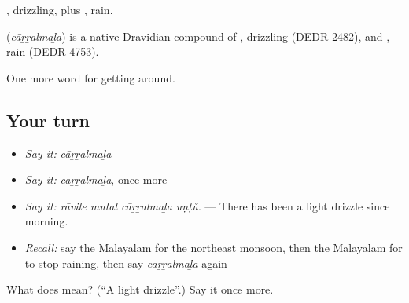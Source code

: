 , drizzling, plus , rain.

\begin{cousinweb}
\textbf{} (\emph{cāṟṟalmaḻa}) is a native Dravidian compound of , drizzling (DEDR 2482), and , rain (DEDR 4753).
\end{cousinweb}

\begin{grammarlens}[title={What you've built}]
One more word for getting around.
\end{grammarlens}

\subsection*{Your turn}
\begin{itemize}
\raggedright
  \item \emph{Say it:} \emph{cāṟṟalmaḻa}
  \item \emph{Say it:} \emph{cāṟṟalmaḻa}, once more
  \item \emph{Say it:} \emph{rāvile mutal cāṟṟalmaḻa uṇṭŭ.} — There has been a light drizzle since morning.
  \item \emph{Recall:} say the Malayalam for the northeast monsoon, then the Malayalam for to stop raining, then say \emph{cāṟṟalmaḻa} again
\end{itemize}

\begin{tcolorbox}[breakable,colback=teal!4,colframe=teal!35!black,title={Before you move on}]
What does  mean? (\textquotedblleft{}A light drizzle\textquotedblright{}.) Say it once more.
\end{tcolorbox}
